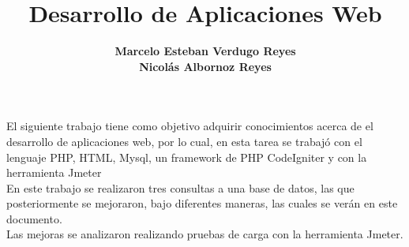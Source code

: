 \documentclass[12pt,letterpaper]{report}
\begin{document}
\title{\textbf{Desarrollo de Aplicaciones Web}}
\author{\textbf{Marcelo Esteban Verdugo Reyes \\ Nicolás Albornoz Reyes}}

\beforepreface
{}
El siguiente trabajo tiene como objetivo adquirir conocimientos acerca de el desarrollo de aplicaciones web, por lo cual, en esta tarea se trabajó con el lenguaje PHP, HTML, Mysql, un framework de PHP CodeIgniter y con la herramienta Jmeter \\

En este trabajo se realizaron tres consultas a una base de datos, las que posteriormente se mejoraron, bajo diferentes maneras, las cuales se verán en este documento. \\ 
Las mejoras se analizaron realizando pruebas de carga con la herramienta Jmeter.


\renewcommand{\thepage}{\roman{page}}
\tableofcontents
\newpage
\listoftables
\listoffigures
\newpage

\renewcommand{\thepage}{\arabic{page}}





\end{document}
